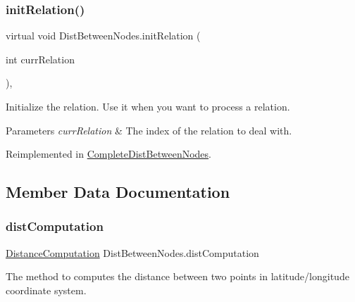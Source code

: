 \subsubsection{\texorpdfstring{init\+Relation()}{initRelation()}}
{\footnotesize\ttfamily virtual void Dist\+Between\+Nodes.\+init\+Relation (\begin{DoxyParamCaption}\item[{int}]{curr\+Relation }\end{DoxyParamCaption})\hspace{0.3cm}{\ttfamily [inline]}, {\ttfamily [virtual]}}



Initialize the relation. Use it when you want to process a relation. 


\begin{DoxyParams}{Parameters}
{\em curr\+Relation} & The index of the relation to deal with.\\
\hline
\end{DoxyParams}


Reimplemented in \hyperlink{classCompleteDistBetweenNodes_a31b5ab0e3d811be03f4c7f54ec0d16a4}{Complete\+Dist\+Between\+Nodes}.



\subsection{Member Data Documentation}
\mbox{\label{classDistBetweenNodes_a6b95035e7b7985c3b0e9923407d6c149}} 
\subsubsection{\texorpdfstring{dist\+Computation}{distComputation}}
{\footnotesize\ttfamily \hyperlink{classDistanceComputation}{Distance\+Computation} Dist\+Between\+Nodes.\+dist\+Computation\hspace{0.3cm}{\ttfamily [protected]}}



The method to computes the distance between two points in latitude/longitude coordinate system.

\mbox{\label{classDistBetweenNodes_a2a87914cc1b9e98fa17635950df55bd9}} 
